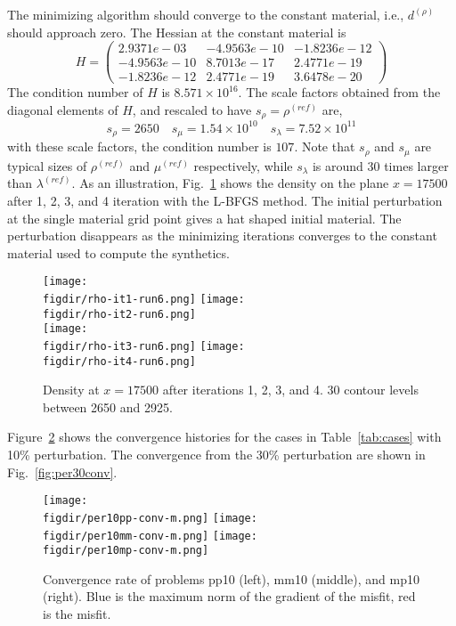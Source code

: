 \documentclass[12pt]{report}
\def\figdir{mfigs}
\begin{document}
The minimizing algorithm should converge to the constant material, i.e., $d^{(\rho)}$ should approach
zero. The Hessian at the constant material is 
$$
H= \begin{pmatrix}    2.9371e-03 &  -4.9563e-10 & -1.8236e-12 \\
                     -4.9563e-10 &  8.7013e-17  & 2.4771e-19 \\
                     -1.8236e-12 &  2.4771e-19  & 3.6478e-20
   \end{pmatrix}
$$
The condition number of $H$ is $8.571\times 10^{16}$.  
The scale factors obtained from the diagonal elements of $H$, and rescaled to have $s_{\rho}=\rho^{(ref)}$
are,
$$
 s_{\rho} =2650\quad s_\mu = 1.54\times 10^{10}\quad  s_\lambda = 7.52\times 10^{11}
$$
with these scale factors, the condition number is $107$. Note that $s_\rho$ and $s_\mu$ are typical sizes 
of $\rho^{(ref)}$ and $\mu^{(ref)}$ respectively, while $s_\lambda$ is around 30 times larger 
than $\lambda^{(ref)}$.
As an illustration, Fig.~\ref{fig:images} shows the density on the plane $x=17500$ after 1, 2, 3, and 4 iteration
with the L-BFGS method. The initial perturbation at the single material grid point gives a hat shaped initial 
material. The perturbation disappears as the minimizing iterations converges to the constant material 
used to compute the synthetics.
\begin{figure}
\begin{center}
\texttt{[image: \\figdir/rho-it1-run6.png]}\hfil
\texttt{[image: \\figdir/rho-it2-run6.png]}\hfil \\
\texttt{[image: \\figdir/rho-it3-run6.png]}
\texttt{[image: \\figdir/rho-it4-run6.png]}
\caption{Density at $x=17500$ after iterations 1, 2, 3, and 4. 30 contour levels between 2650 and 2925.}
\label{fig:images}
\end{center}
\end{figure}
Figure~\ref{fig:per10conv} shows the convergence histories for the cases in Table~\ref{tab:cases} 
with 10\% perturbation. The convergence from the 30\% perturbation are shown in Fig.~\ref{fig:per30conv}.
\begin{figure}
\begin{center}
\texttt{[image: \\figdir/per10pp-conv-m.png]}\hfil
\texttt{[image: \\figdir/per10mm-conv-m.png]}\hfil
\texttt{[image: \\figdir/per10mp-conv-m.png]}
\caption{Convergence rate of problems pp10 (left), mm10 (middle), and mp10 (right). Blue
is the maximum norm of the gradient of the misfit, red is the misfit.}
\label{fig:per10conv}
\end{center}
\end{figure}
\end{document}
